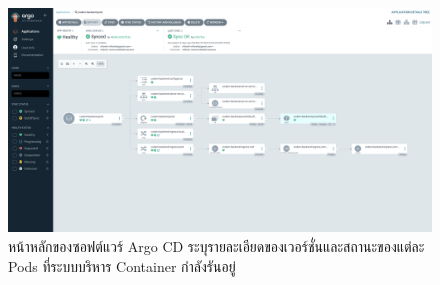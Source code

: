 \documentclass[12pt,one side,openright,a4paper]{cpe-thesis-th}
\begin{document}
            \begin{figure}[H]
                \centering
                \includegraphics[width=12cm]{figure/results/argo.png}
                \caption[หน้าของซอฟต์แวร์ Argo CD]{หน้าหลักของซอฟต์แวร์ Argo CD ระบุรายละเอียดของเวอร์ชั่นและสถานะของแต่ละ Pods ที่ระบบบริหาร Container กำลังรันอยู่}
                \label{fig:res-argo}
            \end{figure}
\end{document}
